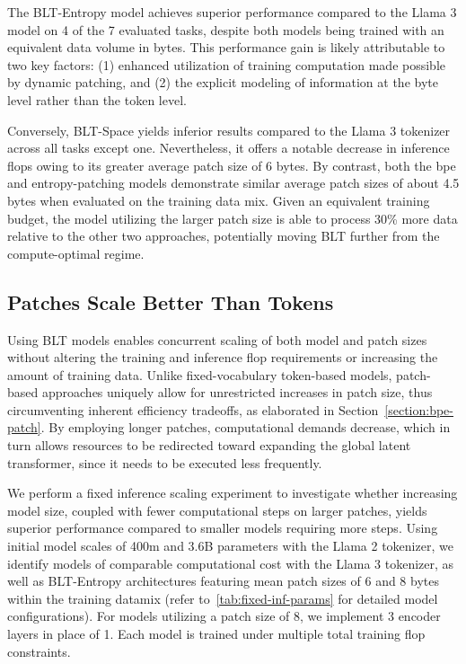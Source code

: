 The {\textsc BLT}-Entropy model achieves superior performance compared to the Llama 3 model on 4 of the 7 evaluated tasks, despite both models being trained with an equivalent data volume in bytes. This performance gain is likely attributable to two key factors: (1) enhanced utilization of training computation made possible by dynamic patching, and (2) the explicit modeling of information at the byte level rather than the token level.

Conversely, {\textsc BLT}-Space yields inferior results compared to the Llama 3 tokenizer across all tasks except one. Nevertheless, it offers a notable decrease in inference flops owing to its greater average patch size of 6 bytes. By contrast, both the bpe and entropy-patching models demonstrate similar average patch sizes of about 4.5 bytes when evaluated on the training data mix. Given an equivalent training budget, the model utilizing the larger patch size is able to process 30\% more data relative to the other two approaches, potentially moving {\textsc BLT} further from the compute-optimal regime.

\subsection{Patches Scale Better Than Tokens} Using {\textsc BLT} models enables concurrent scaling of both model and patch sizes without altering the training and inference flop requirements or increasing the amount of training data. Unlike fixed-vocabulary token-based models, patch-based approaches uniquely allow for unrestricted increases in patch size, thus circumventing inherent efficiency tradeoffs, as elaborated in Section~\ref{section:bpe-patch}. By employing longer patches, computational demands decrease, which in turn allows resources to be redirected toward expanding the global latent transformer, since it needs to be executed less frequently.

We perform a fixed inference scaling experiment to investigate whether increasing model size, coupled with fewer computational steps on larger patches, yields superior performance compared to smaller models requiring more steps. Using initial model scales of 400m and 3.6B parameters with the Llama 2 tokenizer, we identify models of comparable computational cost with the Llama 3 tokenizer, as well as {\textsc BLT}-Entropy architectures featuring mean patch sizes of 6 and 8 bytes within the training datamix (refer to~\autoref{tab:fixed-inf-params} for detailed model configurations). For models utilizing a patch size of 8, we implement 3 encoder layers in place of 1. Each model is trained under multiple total training flop constraints.

